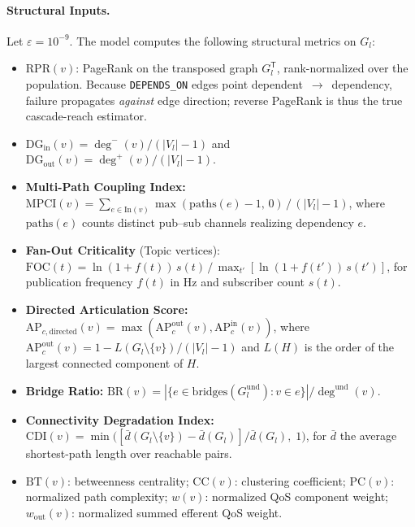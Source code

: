 \paragraph{Structural Inputs.}
Let $\varepsilon = 10^{-9}$. The model computes the following structural metrics on $G_l$:
\begin{itemize}
    \item $\mathrm{RPR}(v)$: PageRank on the transposed graph $G_l^{\mathsf T}$, rank-normalized over the population. Because \texttt{DEPENDS\_ON} edges point dependent~$\to$~dependency, failure propagates \emph{against} edge direction; reverse PageRank is thus the true cascade-reach estimator.
    \item $\mathrm{DG}_{\text{in}}(v) = \deg^{-}(v) / (|V_l| - 1)$ and $\mathrm{DG}_{\text{out}}(v) = \deg^{+}(v) / (|V_l| - 1)$.
    \item \textbf{Multi-Path Coupling Index:} $\mathrm{MPCI}(v) = \sum_{e \in \mathrm{In}(v)} \max(\mathrm{paths}(e) - 1,\, 0) \,/\, (|V_l| - 1)$, where $\mathrm{paths}(e)$ counts distinct pub--sub channels realizing dependency $e$.
    \item \textbf{Fan-Out Criticality} (Topic vertices): $\mathrm{FOC}(t) = \ln(1 + f(t))\, s(t) \,/\, \max_{t'} [\ln(1 + f(t'))\, s(t')]$, for publication frequency $f(t)$ in Hz and subscriber count $s(t)$.
    \item \textbf{Directed Articulation Score:} $\mathrm{AP}_{c,\text{directed}}(v) = \max(\mathrm{AP}_c^{\text{out}}(v), \mathrm{AP}_c^{\text{in}}(v))$, where $\mathrm{AP}_{c}^{\text{out}}(v) = 1 - L(G_l \setminus \{v\})/(|V_l|-1)$ and $L(H)$ is the order of the largest connected component of $H$.
    \item \textbf{Bridge Ratio:} $\mathrm{BR}(v) = |\{e \in \mathrm{bridges}(G_l^{\text{und}}) : v \in e\}| / \deg^{\text{und}}(v)$.
    \item \textbf{Connectivity Degradation Index:} $\mathrm{CDI}(v) = \min\!\big( [\bar{d}(G_l \setminus \{v\}) - \bar{d}(G_l)] / \bar{d}(G_l),\; 1 \big)$, for $\bar{d}$ the average shortest-path length over reachable pairs.
    \item $\mathrm{BT}(v)$: betweenness centrality; $\mathrm{CC}(v)$: clustering coefficient; $\mathrm{PC}(v)$: normalized path complexity; $w(v)$: normalized QoS component weight; $w_{\text{out}}(v)$: normalized summed efferent QoS weight.
\end{itemize}

